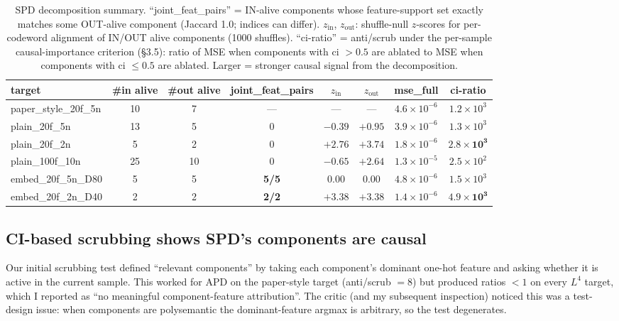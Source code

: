 \documentclass[11pt]{article}
\begin{document}
\begin{table}[h]
\centering
\caption{SPD decomposition summary. ``joint\_feat\_pairs'' = IN-alive
components whose feature-support set exactly matches some OUT-alive
component (Jaccard 1.0; indices can differ). $z_\mathrm{in}$,
$z_\mathrm{out}$: shuffle-null $z$-scores for per-codeword alignment of
IN/OUT alive components (1000 shuffles). ``ci-ratio'' = anti/scrub under
the per-sample causal-importance criterion (§3.5): ratio of MSE when
components with ci $> 0.5$ are ablated to MSE when components with ci
$\le 0.5$ are ablated. Larger = stronger causal signal from the
decomposition.}
\label{tab:summary}
\small
\begin{tabular}{lccccccc}
\toprule
target & \#in alive & \#out alive & joint\_feat\_pairs & $z_\mathrm{in}$ & $z_\mathrm{out}$ & mse\_full & ci-ratio \\
\midrule
paper\_style\_20f\_5n & 10 & 7  & — & — & — & $4.6\times10^{-6}$ & $1.2\times10^{3}$ \\
\midrule
plain\_20f\_5n       & 13 & 5 & 0 & $-0.39$ & $+0.95$ & $3.9\times10^{-6}$ & $1.3\times10^{3}$ \\
plain\_20f\_2n       & 5  & 2 & 0 & $\mathbf{+2.76}$ & $\mathbf{+3.74}$ & $1.8\times10^{-6}$ & $\mathbf{2.8\times10^{3}}$ \\
plain\_100f\_10n     & 25 & 10 & 0 & $-0.65$ & $+2.64$ & $1.3\times10^{-5}$ & $2.5\times10^{2}$ \\
embed\_20f\_5n\_D80  & 5  & 5 & \textbf{5/5} & $0.00$ & $0.00$ & $4.8\times10^{-6}$ & $1.5\times10^{3}$ \\
embed\_20f\_2n\_D40  & 2  & 2 & \textbf{2/2} & $\mathbf{+3.38}$ & $\mathbf{+3.38}$ & $1.4\times10^{-6}$ & $\mathbf{4.9\times10^{3}}$ \\
\bottomrule
\end{tabular}
\end{table}

\subsection{CI-based scrubbing shows SPD's components are causal}
\label{sec:ciscrub}

Our initial scrubbing test defined ``relevant components'' by taking
each component's dominant one-hot feature and asking whether it is
active in the current sample. This worked for APD on the paper-style
target (anti/scrub $= 8$) but produced ratios $< 1$ on every $L^4$
target, which I reported as ``no meaningful component-feature
attribution''. The critic (and my subsequent inspection) noticed this
was a test-design issue: when components are polysemantic the
dominant-feature argmax is arbitrary, so the test degenerates.
\end{document}
